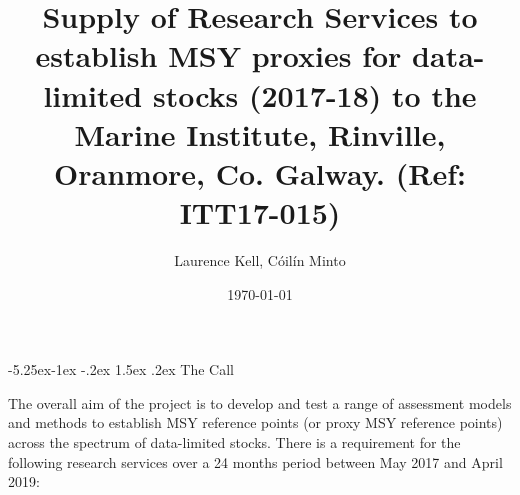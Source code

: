 \documentclass[a4paper, 10pt]{article}
\title{Supply of Research Services to establish MSY proxies for data-limited stocks (2017-18) to the Marine Institute, Rinville, Oranmore, Co. Galway.
(Ref: ITT17-015)}
\author{Laurence Kell, C\'oil\'in Minto}
\date{\today}
\makeatletter
\renewcommand{\section}{\@startsection{section}{1}{\z@}%
  {-5.25ex\@plus -1ex \@minus -.2ex}%
  {1.5ex \@plus .2ex}%
  {\normalfont\bfseries}}
\makeatother
\begin{document}
\onehalfspacing
{}
\rhead{}

\maketitle
\thispagestyle{fancy}
\pagestyle{empty}

%

\newpage
\tableofcontents
\newpage

\begin{abstract}

\textit{}

\end{abstract}

\onehalfspacing
{}
\rhead{}

\maketitle
\thispagestyle{fancy}
\pagestyle{empty}


\maketitle

\newpage\section{The Call}

The overall aim of the project is to develop and test a range of assessment models and methods to establish MSY reference points (or proxy MSY reference points) across the spectrum of data-limited stocks. There is a requirement for the following research services over a 24 months period between May 2017 and April 2019: 
\end{document}
